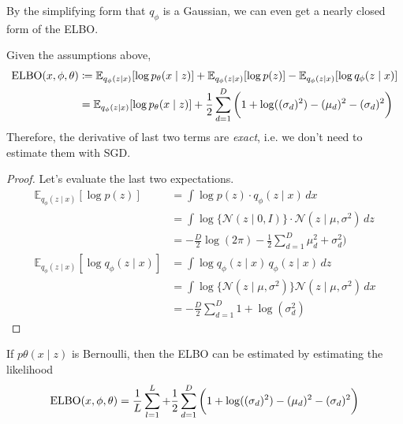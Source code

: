   By the simplifying form that $q_\phi$ is a Gaussian, we can even get a nearly closed form of the ELBO. 

  \begin{theorem}
    Given the assumptions above, 
    \begin{align}
      \elbo(x, \phi, \theta) & \coloneqq \mathbb{E}_{q_\phi(z \mid x)} [ \log p_\theta (x \mid z)] + \mathbb{E}_{q_\phi (z \mid x)} [ \log p(z)] - \mathbb{E}_{q_\phi (z \mid x)} [ \log q_\phi (z \mid x)] \\
                             & = \mathbb{E}_{q_\phi(z \mid x)} [ \log p_\theta (x \mid z)] + \frac{1}{2} \sum_{d=1}^D \bigg( 1 + \log( (\sigma_d)^2 ) - (\mu_d)^2 - (\sigma_d)^2 \bigg)
    \end{align}
    Therefore, the derivative of last two terms are \textit{exact}, i.e. we don't need to estimate them with SGD. 
  \end{theorem}
  \begin{proof}
    Let's evaluate the last two expectations. 
    \begin{align}
      \mathbb{E}_{q_\phi (z \mid x)} [ \log p(z)] & = \int \log p(z) \cdot q_\phi (z \mid x) \,dx \\
                                                  & = \int \log \{\mathcal{N} (z \mid 0, I) \}  \cdot \mathcal{N}(z \mid \mu, \sigma^2) \,dz  \\
                                                  & = - \frac{D}{2} \log (2 \pi) - \frac{1}{2} \sum_{d=1}^D \mu_d^2 + \sigma_d^2) \\
      \mathbb{E}_{q_\phi (z \mid x)} [ \log q_\phi (z \mid x)] & = \int \log q_\phi (z \mid x) \, q_\phi (z \mid x) \,dz \\
                                                               & = \int \log \{ \mathcal{N}(z \mid \mu, \sigma^2) \} \mathcal{N}(z \mid \mu, \sigma^2) \,dx \\
                                                               & = -\frac{D}{2} \sum_{d=1}^D 1 + \log (\sigma_d^2)
    \end{align}
  \end{proof} 

  \begin{corollary}
    If $p\theta (x \mid z)$ is Bernoulli, then the ELBO can be estimated by estimating the likelihood 
    \begin{equation}
      \elbo(x, \phi, \theta) = \frac{1}{L} \sum_{l=1}^L + \frac{1}{2} \sum_{d=1}^D \bigg( 1 + \log( (\sigma_d)^2 ) - (\mu_d)^2 - (\sigma_d)^2 \bigg)
    \end{equation}
  \end{corollary}

